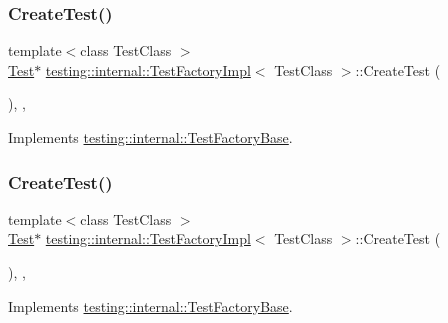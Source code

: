 \subsubsection{\texorpdfstring{CreateTest()}{CreateTest()}\hspace{0.1cm}{\footnotesize\ttfamily [1/3]}}
{\footnotesize\ttfamily template$<$class Test\+Class $>$ \\
\mbox{\hyperlink{classtesting_1_1_test}{Test}}$\ast$ \mbox{\hyperlink{classtesting_1_1internal_1_1_test_factory_impl}{testing\+::internal\+::\+Test\+Factory\+Impl}}$<$ Test\+Class $>$\+::Create\+Test (\begin{DoxyParamCaption}{ }\end{DoxyParamCaption})\hspace{0.3cm}{\ttfamily [inline]}, {\ttfamily [override]}, {\ttfamily [virtual]}}



Implements \mbox{\hyperlink{classtesting_1_1internal_1_1_test_factory_base_a07ac3ca0b196cdb092da0bb186b7c030}{testing\+::internal\+::\+Test\+Factory\+Base}}.

\mbox{\label{classtesting_1_1internal_1_1_test_factory_impl_ab9b9236ef39b14f0a78e611748e970e3}} 
\subsubsection{\texorpdfstring{CreateTest()}{CreateTest()}\hspace{0.1cm}{\footnotesize\ttfamily [2/3]}}
{\footnotesize\ttfamily template$<$class Test\+Class $>$ \\
\mbox{\hyperlink{classtesting_1_1_test}{Test}}$\ast$ \mbox{\hyperlink{classtesting_1_1internal_1_1_test_factory_impl}{testing\+::internal\+::\+Test\+Factory\+Impl}}$<$ Test\+Class $>$\+::Create\+Test (\begin{DoxyParamCaption}{ }\end{DoxyParamCaption})\hspace{0.3cm}{\ttfamily [inline]}, {\ttfamily [override]}, {\ttfamily [virtual]}}



Implements \mbox{\hyperlink{classtesting_1_1internal_1_1_test_factory_base_a07ac3ca0b196cdb092da0bb186b7c030}{testing\+::internal\+::\+Test\+Factory\+Base}}.

